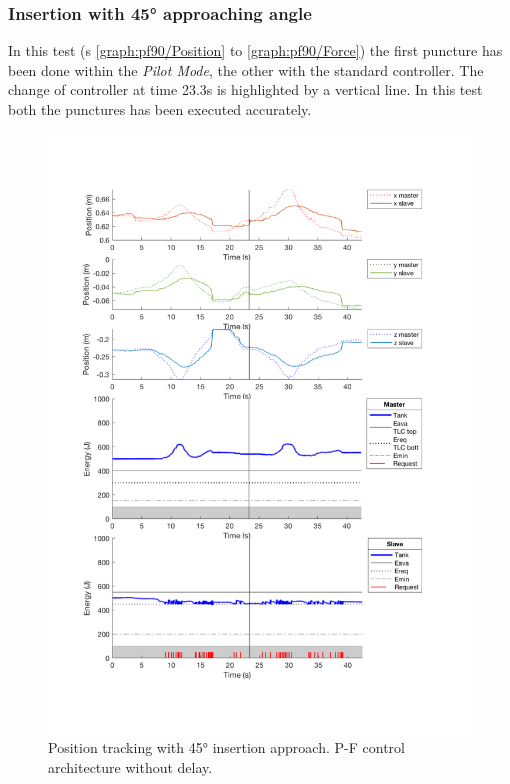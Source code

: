 \subsubsection{Insertion with 45° approaching angle}
In this test  (\figurename s{ \ref{graph:pf90/Position} to \ref{graph:pf90/Force}}) the first puncture has been done within the \textit{Pilot Mode}, the other with the standard controller.
The change of controller at time 23.3s is highlighted by a vertical line.
In this test both the punctures has been executed accurately.
\begin{center}
	\begin{figure}
		\includegraphics[width=\textwidth, keepaspectratio]{plots/pf45/Position.pdf}
		\caption{Position tracking with 45° insertion approach. P-F control architecture without delay.}
		\label{graph:pf45/Position}
	\end{figure}
\end{center}
